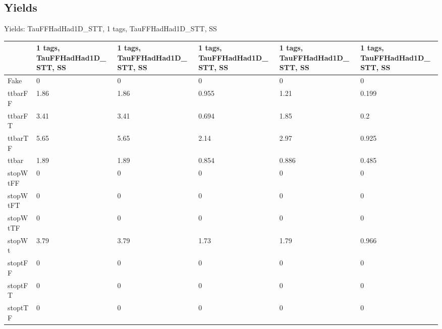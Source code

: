 
\subsection{Yields}

\begin{frame}{Yields: TauFFHadHad1D\_STT, 1 tags, TauFFHadHad1D\_STT, SS}
\begin{center}
  \begin{tabular}{l| >{\centering\let\newline\\\arraybackslash\hspace{0pt}}m{1.4cm}| >{\centering\let\newline\\\arraybackslash\hspace{0pt}}m{1.4cm}| >{\centering\let\newline\\\arraybackslash\hspace{0pt}}m{1.4cm}| >{\centering\let\newline\\\arraybackslash\hspace{0pt}}m{1.4cm}| >{\centering\let\newline\\\arraybackslash\hspace{0pt}}m{1.4cm}}
    & 1 tags, TauFFHadHad1D\_STT, SS & 1 tags, TauFFHadHad1D\_STT, SS & 1 tags, TauFFHadHad1D\_STT, SS & 1 tags, TauFFHadHad1D\_STT, SS & 1 tags, TauFFHadHad1D\_STT, SS \\
 \hline \hline
    Fake& 0 & 0 & 0 & 0 & 0 \\
 \hline
    ttbarFF& 1.86 & 1.86 & 0.955 & 1.21 & 0.199 \\
 \hline
    ttbarFT& 3.41 & 3.41 & 0.694 & 1.85 & 0.2 \\
 \hline
    ttbarTF& 5.65 & 5.65 & 2.14 & 2.97 & 0.925 \\
 \hline
    ttbar& 1.89 & 1.89 & 0.854 & 0.886 & 0.485 \\
 \hline
    stopWtFF& 0 & 0 & 0 & 0 & 0 \\
 \hline
    stopWtFT& 0 & 0 & 0 & 0 & 0 \\
 \hline
    stopWtTF& 0 & 0 & 0 & 0 & 0 \\
 \hline
    stopWt& 3.79 & 3.79 & 1.73 & 1.79 & 0.966 \\
 \hline
    stoptFF& 0 & 0 & 0 & 0 & 0 \\
 \hline
    stoptFT& 0 & 0 & 0 & 0 & 0 \\
 \hline
    stoptTF& 0 & 0 & 0 & 0 & 0 \\

\end{tabular}
\end{center}
\end{frame}
